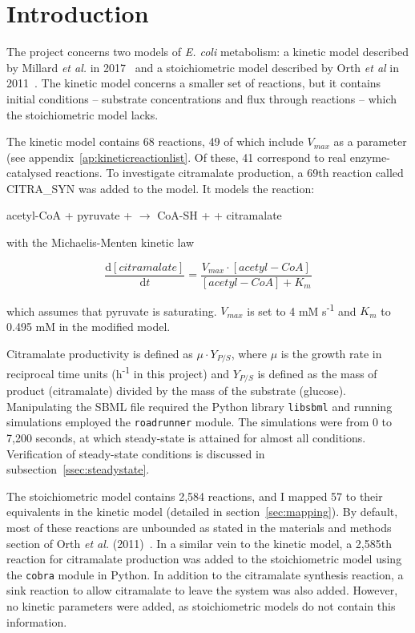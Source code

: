 \documentclass[parskip=full]{scrreprt}
\begin{document}
\chapter*{Introduction}
\label{ch:intro}

The project concerns two models of \emph{E. coli} metabolism: a kinetic model described by Millard \emph{et al.} in 2017~\cite{millard_metabolic_2017} and a stoichiometric model described by Orth \emph{et al} in 2011~\cite{orth_comprehensive_2011}. The kinetic model concerns a smaller set of reactions, but it contains initial conditions -- substrate concentrations and flux through reactions -- which the stoichiometric model lacks.

The kinetic model contains 68 reactions, 49 of which include $V_{max}$ as a parameter (see appendix~\ref{ap:kineticreactionlist}. Of these, 41 correspond to real enzyme-catalysed reactions. To investigate citramalate production, a 69th reaction called CITRA\_SYN was added to the model. It models the reaction:

\begin{center}
  acetyl-CoA + pyruvate +  $\rightarrow$ CoA-SH +  + citramalate
\end{center}

with the Michaelis-Menten kinetic law

\[
  \frac{\mathrm{d}[citramalate]}{\mathrm{d}t} = 
  \frac{V_{max} \cdot [acetyl-CoA]}{[acetyl-CoA] + K_{m}}
\]

which assumes that pyruvate is saturating. $V_{max}$ is set to 4 mM s\textsuperscript{-1} and $K_{m}$ to 0.495 mM in the modified model.

Citramalate productivity is defined as $\mu \cdot Y_{P/S}$, where $\mu$ is the growth rate in reciprocal time units (h\textsuperscript{-1} in this project) and $Y_{P/S}$ is defined as the mass of product (citramalate) divided by the mass of the substrate (glucose). Manipulating the SBML file required the Python library \texttt{libsbml} and running simulations employed the \texttt{roadrunner} module. The simulations were from 0 to 7,200 seconds, at which steady-state is attained for almost all conditions. Verification of steady-state conditions is discussed in subsection~\ref{ssec:steadystate}.

The stoichiometric model contains 2,584 reactions, and I mapped 57 to their equivalents in the kinetic model (detailed in section~\ref{sec:mapping}). By default, most of these reactions are unbounded as stated in the materials and methods section of Orth \emph{et al.} (2011)~\cite{orth_comprehensive_2011}. In a similar vein to the kinetic model, a 2,585th reaction for citramalate production was added to the stoichiometric model using the \texttt{cobra} module in Python. In addition to the citramalate synthesis reaction, a sink reaction to allow citramalate to leave the system was also added. However, no kinetic parameters were added, as stoichiometric models do not contain this information.
\end{document}
